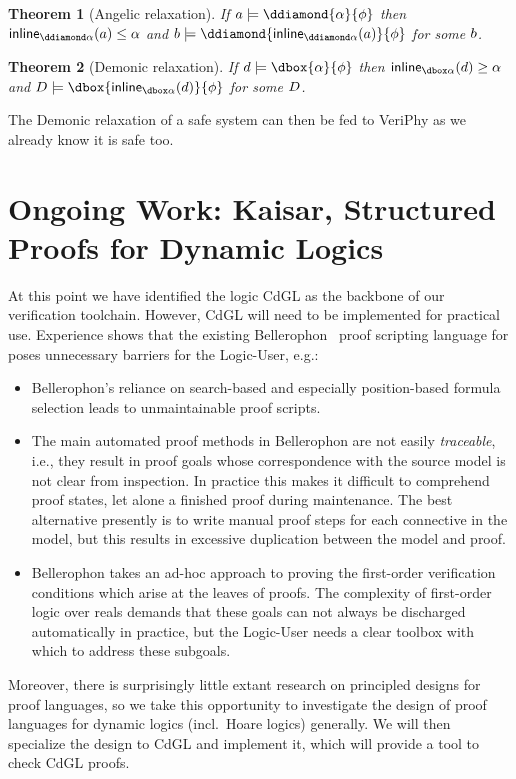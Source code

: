\documentclass[12pt]{cmuthesis}
\newtheorem{theorem}{Theorem}
\theoremstyle{definition}
\theoremstyle{remark}
\newcommand{\CdGL}{\textsf{CdGL}\xspace}
\newcommand{\VeriPhy}{VeriPhy\xspace}
\begin{document}
\begin{theorem}[Angelic relaxation]
  If $\aa \models \ddiamond{\alpha}{\phi}$ then $\ainline{\alpha}{\aa} \leq \alpha$ and $\ab \models \ddiamond{\ainline{\alpha}{\aa}}{\phi}$ for some $b$.
\end{theorem}
\begin{theorem}[Demonic relaxation]
  If $\da \models \dbox{\alpha}{\phi}$ then $\dinline{\alpha}{\da} \geq \alpha$ and $\db \models \dbox{\dinline{\alpha}{\da}}{\phi}$ for some $D$.
\end{theorem}

The Demonic relaxation of a safe system can then be fed to \VeriPhy as we already know it is safe too.


\chapter{Ongoing Work: Kaisar, Structured Proofs for Dynamic Logics}
\label{ch:kaisar}
At this point we have identified the logic \CdGL as the backbone of our verification toolchain.
However, \CdGL will need to be implemented for practical use.
Experience shows that the existing Bellerophon~\cite{DBLP:conf/itp/FultonMBP17} proof scripting language for \dGL poses unnecessary barriers for the Logic-User, e.g.:
\begin{itemize}
\item Bellerophon's reliance on search-based and especially position-based formula selection leads to unmaintainable proof scripts.
\item The main automated proof methods in Bellerophon are not easily \emph{traceable}, i.e., they result in proof goals whose correspondence with the source model is not clear from inspection.
In practice this makes it difficult to comprehend proof states, let alone a finished proof during maintenance.
The best alternative presently is to write manual proof steps for each connective in the model, but this results in excessive duplication between the model and proof.
\item Bellerophon takes an ad-hoc approach to proving the first-order verification conditions which arise at the leaves of proofs.
The complexity of first-order logic over reals demands that these goals can not always be discharged automatically in practice,
but the Logic-User needs a clear toolbox with which to address these subgoals.
\end{itemize}
Moreover, there is surprisingly little extant research on principled designs for proof languages, so we take this opportunity to investigate the design of proof languages for dynamic logics (incl.\ Hoare logics) generally.
We will then specialize the design to \CdGL and implement it, which will provide a tool to check \CdGL proofs.
\end{document}
